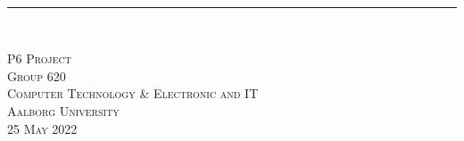 \thispagestyle{empty}
\vspace{3cm}

\phantom{hul}

\phantom{hul}

\phantom{hul}

\textsl{\Huge } \\ \vspace{1cm}
\rule{15cm}{3mm} \\ \vspace{1cm}
\vspace{1cm}


\vspace{2cm} 
\textsc{\Large P6 Project \\
Group 620 \\
Computer Technology \& Electronic and IT\\
Aalborg University\\
25 May 2022\\
}
